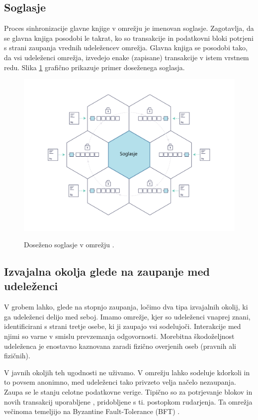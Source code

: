 \documentclass[a4paper, 12pt]{book}
\begin{document}
\subsection{Soglasje}
Proces sinhronizacije glavne knjige v omrežju je imenovan soglasje.
Zagotavlja, da se glavna knjiga posodobi le takrat, ko so transakcije in podatkovni bloki potrjeni s strani zaupanja vrednih udeležencev omrežja.
Glavna knjiga se posodobi tako, da vsi udeleženci omrežja, izvedejo enake (zapisane) transakcije v istem vrstnem redu.
Slika \ref{consensus} grafično prikazuje primer doseženega soglasja.

\begin{figure}[h]
	\includegraphics[width=1.0\textwidth]{slike/consensus.png}
	\label{consensus}
	\caption{Doseženo soglasje v omrežju \cite{hyperledgerDocs}.}
\end{figure}


\subsection{Izvajalna okolja glede na zaupanje med udeleženci}
V grobem lahko, glede na stopnjo zaupanja, ločimo dva tipa izvajalnih okolij, ki ga udeleženci delijo med seboj.
Imamo omrežje, kjer so udeleženci vnaprej znani, identificirani s strani tretje osebe, ki ji zaupajo vsi sodelujoči.
Interakcije med njimi so varne v smislu prevzemanja odgovornosti.
Morebitna škodoželjnost udeleženca je enostavno kaznovana zaradi fizično overjenih oseb (pravnih ali fizičnih).

V javnih okoljih teh ugodnosti ne uživamo.
V omrežju lahko sodeluje kdorkoli in to povsem anonimno,
med udeleženci tako privzeto velja načelo nezaupanja.
Zaupa se le stanju celotne podatkovne verige.
Tipično so za potrjevanje blokov in novih transakcij uporabljene , pridobljene s ti. postopkom rudarjenja.
Ta omrežja večinoma temeljijo na Byzantine Fault-Tolerance (BFT) \cite{hyperledgerDocs, castro1999practical}.
\end{document}
